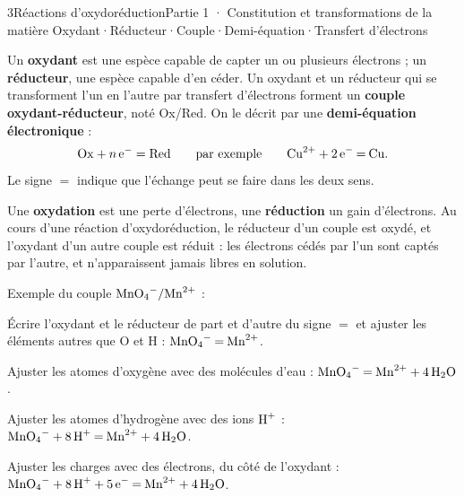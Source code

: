 \begin{ouverture}[redox]{3}{Réactions d'oxydoréduction}{Partie 1 · Constitution et transformations de la matière}
{Oxydant\enspace·\enspace Réducteur\enspace·\enspace Couple\enspace·\enspace Demi-équation\enspace·\enspace Transfert d'électrons}
\end{ouverture}
\essentiel
{}
\begin{definition}
Un \textbf{oxydant} est une espèce capable de capter un ou plusieurs électrons ; un \textbf{réducteur}, une espèce capable d'en
céder. Un oxydant et un réducteur qui se transforment l'un en l'autre par transfert d'électrons forment un \textbf{couple
oxydant-réducteur}, noté Ox/Red. On le décrit par une \textbf{demi-équation électronique} :
\[\mathrm{Ox}+n\,\mathrm{e}^-=\mathrm{Red}\qquad\text{par exemple}\qquad\ce{Cu^{2+} + 2e- = Cu}.\]
Le signe $=$ indique que l'échange peut se faire dans les deux sens.
\end{definition}
\begin{definition}
Une \textbf{oxydation} est une perte d'électrons, une \textbf{réduction} un gain d'électrons. Au cours d'une réaction
d'oxydoréduction, le réducteur d'un couple est oxydé, et l'oxydant d'un autre couple est réduit : les électrons cédés
par l'un sont captés par l'autre, et n'apparaissent jamais libres en solution.
\end{definition}
\begin{savoirfaire}
Exemple du couple $\ce{MnO4-}/\ce{Mn^{2+}}$ :
\begin{questions}
\item Écrire l'oxydant et le réducteur de part et d'autre du signe $=$ et ajuster les éléments autres que O et H :
$\ce{MnO4- = Mn^{2+}}$.
\item Ajuster les atomes d'oxygène avec des molécules d'eau : $\ce{MnO4- = Mn^{2+} + 4H2O}$.
\item Ajuster les atomes d'hydrogène avec des ions $\ce{H+}$ : $\ce{MnO4- + 8H+ = Mn^{2+} + 4H2O}$.
\item Ajuster les charges avec des électrons, du côté de l'oxydant : $\ce{MnO4- + 8H+ + 5e- = Mn^{2+} + 4H2O}$.
\end{questions}
\end{savoirfaire}
